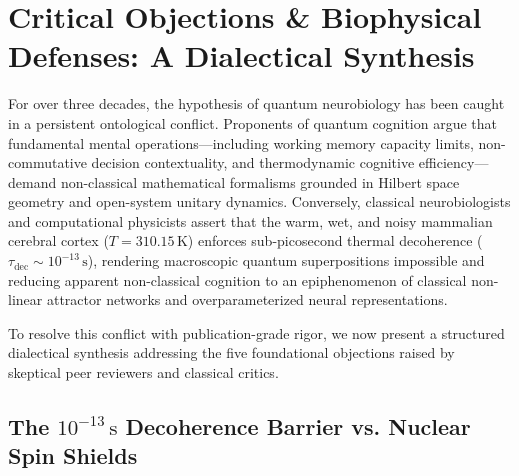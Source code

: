 \documentclass[10pt,twocolumn,3p]{article}
\begin{document}
\section{Critical Objections \& Biophysical Defenses: A Dialectical Synthesis}
\label{sec:dialectical_synthesis}

For over three decades, the hypothesis of quantum neurobiology has been caught in a persistent ontological conflict. Proponents of quantum cognition argue that fundamental mental operations---including working memory capacity limits, non-commutative decision contextuality, and thermodynamic cognitive efficiency---demand non-classical mathematical formalisms grounded in Hilbert space geometry and open-system unitary dynamics. Conversely, classical neurobiologists and computational physicists assert that the warm, wet, and noisy mammalian cerebral cortex ($T = 310.15\,\text{K}$) enforces sub-picosecond thermal decoherence ($\tau_{\text{dec}} \sim 10^{-13}\,\text{s}$), rendering macroscopic quantum superpositions impossible and reducing apparent non-classical cognition to an epiphenomenon of classical non-linear attractor networks and overparameterized neural representations.

To resolve this conflict with publication-grade rigor, we now present a structured dialectical synthesis addressing the five foundational objections raised by skeptical peer reviewers and classical critics.

\subsection{The $10^{-13}\,\text{s}$ Decoherence Barrier vs. Nuclear Spin Shields}
\label{subsec:dial_decoherence_barrier}
\end{document}
